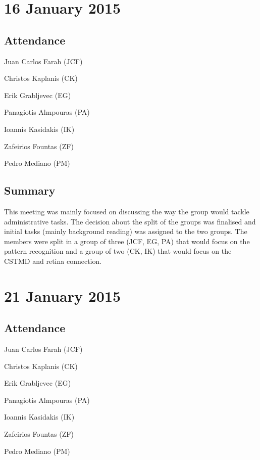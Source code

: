 \documentclass[a4paper,11pt]{article}
\begin{document}
\section*{16 January 2015}
\subsection*{Attendance}
\begin{compactenum}
\item Juan Carlos Farah (JCF)
\item Christos Kaplanis (CK)
\item Erik Grabljevec (EG)
\item Panagiotis Almpouras (PA)
\item Ioannis Kasidakis (IK)
\item Zafeirios Fountas (ZF)
\item Pedro Mediano (PM)
\end{compactenum}

\subsection*{Summary}
This meeting was mainly focused on discussing the way the group would tackle administrative tasks. The decision about the split of the groups was finalised and initial tasks (mainly background reading) was assigned to the two groups. The members were split in a group of three (JCF, EG, PA) that would focus on the pattern recognition and a group of two (CK, IK) that would focus on the CSTMD and retina connection.

\maketitle
\section*{21 January 2015}
\subsection*{Attendance}
\begin{compactenum}
\item Juan Carlos Farah (JCF)
\item Christos Kaplanis (CK)
\item Erik Grabljevec (EG)
\item Panagiotis Almpouras (PA)
\item Ioannis Kasidakis (IK)
\item Zafeirios Fountas (ZF)
\item Pedro Mediano (PM)
\end{compactenum}
\end{document}
